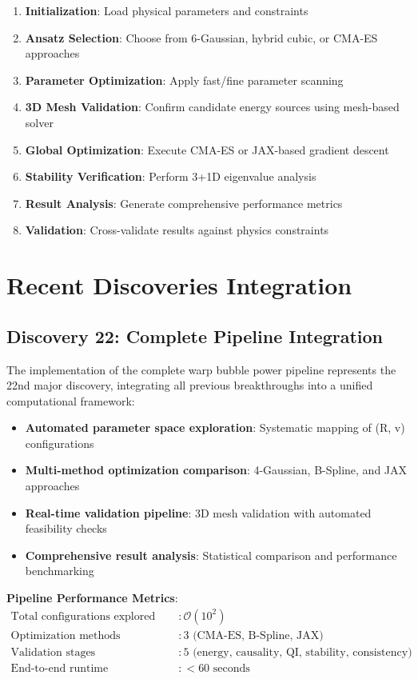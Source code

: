 \documentclass[11pt,a4paper]{article}
\begin{document}
\begin{table}[h]
\begin{table}[h]
\begin{table}[h]
\begin{enumerate}
\item \textbf{Initialization}: Load physical parameters and constraints
\item \textbf{Ansatz Selection}: Choose from 6-Gaussian, hybrid cubic, or CMA-ES approaches
\item \textbf{Parameter Optimization}: Apply fast/fine parameter scanning
\item \textbf{3D Mesh Validation}: Confirm candidate energy sources using mesh-based solver
\item \textbf{Global Optimization}: Execute CMA-ES or JAX-based gradient descent
\item \textbf{Stability Verification}: Perform 3+1D eigenvalue analysis
\item \textbf{Result Analysis}: Generate comprehensive performance metrics
\item \textbf{Validation}: Cross-validate results against physics constraints
\end{enumerate}

\section{Recent Discoveries Integration}

\subsection{Discovery 22: Complete Pipeline Integration}

The implementation of the complete warp bubble power pipeline represents the 22nd major discovery, integrating all previous breakthroughs into a unified computational framework:

\begin{itemize}
\item \textbf{Automated parameter space exploration}: Systematic mapping of (R, v) configurations
\item \textbf{Multi-method optimization comparison}: 4-Gaussian, B-Spline, and JAX approaches
\item \textbf{Real-time validation pipeline}: 3D mesh validation with automated feasibility checks
\item \textbf{Comprehensive result analysis}: Statistical comparison and performance benchmarking
\end{itemize}

\textbf{Pipeline Performance Metrics}:
\begin{align}
\text{Total configurations explored} &: \mathcal{O}(10^2) \\
\text{Optimization methods integrated} &: 3 \text{ (CMA-ES, B-Spline, JAX)} \\
\text{Validation stages} &: 5 \text{ (energy, causality, QI, stability, consistency)} \\
\text{End-to-end runtime} &: < 60 \text{ seconds}
\end{align}


\end{table}
\end{table}
\end{table}
\end{document}
